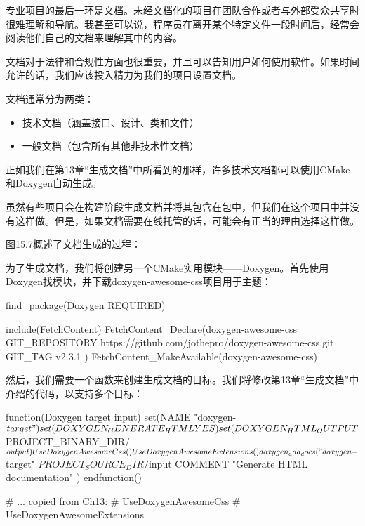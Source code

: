 

专业项目的最后一环是文档。未经文档化的项目在团队合作或者与外部受众共享时很难理解和导航。我甚至可以说，程序员在离开某个特定文件一段时间后，经常会阅读他们自己的文档来理解其中的内容。

文档对于法律和合规性方面也很重要，并且可以告知用户如何使用软件。如果时间允许的话，我们应该投入精力为我们的项目设置文档。

文档通常分为两类：

\begin{itemize}
\item
技术文档（涵盖接口、设计、类和文件）

\item
一般文档（包含所有其他非技术性文档）
\end{itemize}

正如我们在第13章“生成文档”中所看到的那样，许多技术文档都可以使用CMake和Doxygen自动生成。


虽然有些项目会在构建阶段生成文档并将其包含在包中，但我们在这个项目中并没有这样做。但是，如果文档需要在线托管的话，可能会有正当的理由选择这样做。

图15.7概述了文档生成的过程：


为了生成文档，我们将创建另一个CMake实用模块——Doxygen。首先使用Doxygen找模块，并下载doxygen-awesome-css项目用于主题：


\begin{cmake}
find_package(Doxygen REQUIRED)

include(FetchContent)
FetchContent_Declare(doxygen-awesome-css
    GIT_REPOSITORY
        https://github.com/jothepro/doxygen-awesome-css.git
    GIT_TAG
        v2.3.1
)
FetchContent_MakeAvailable(doxygen-awesome-css)
\end{cmake}

然后，我们需要一个函数来创建生成文档的目标。我们将修改第13章“生成文档”中介绍的代码，以支持多个目标：


\begin{cmake}
function(Doxygen target input)
    set(NAME "doxygen-${target}")
    set(DOXYGEN_GENERATE_HTML YES)
    set(DOXYGEN_HTML_OUTPUT ${PROJECT_BINARY_DIR}/${output})

    UseDoxygenAwesomeCss()
    UseDoxygenAwesomeExtensions()

    doxygen_add_docs("doxygen-${target}"
        ${PROJECT_SOURCE_DIR}/${input}
        COMMENT "Generate HTML documentation"
    )
endfunction()

# ... copied from Ch13:
# UseDoxygenAwesomeCss
# UseDoxygenAwesomeExtensions
\end{cmake}

